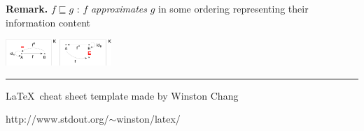 \documentclass[10pt,landscape,a4paper]{article}
\begin{document}
\begin{multicols}{3}
\textbf{Remark.} $f \sqsubseteq g$ : $f$ \emph{approximates} $g$ in some ordering representing their information content
\begin{center}
    \includegraphics[width=0.3\textwidth]{figures/plongement.eps}
\end{center}




\rule{0.3\linewidth}{0.25pt}
\scriptsize

\LaTeX \ cheat sheet template made by Winston Chang

http://www.stdout.org/$\sim$winston/latex/


\end{multicols}
\end{document}
